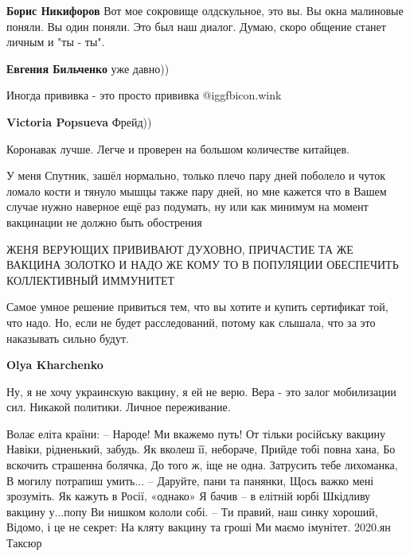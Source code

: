 \begin{itemize}
\begin{itemize} %
\textbf{Борис Никифоров} Вот мое сокровище олдскульное, это вы. Вы окна малиновые поняли. Вы один поняли. Это был наш диалог. Думаю, скоро общение станет личным и "ты - ты".

\textbf{Евгения Бильченко} уже давно))
\end{itemize} %

Иногда прививка - это просто прививка  @igg{fbicon.wink} 

\begin{itemize} %
\textbf{Victoria Popsueva} Фрейд))
\end{itemize} %

Коронавак лучше. Легче и проверен на большом количестве китайцев.


У меня Спутник, зашёл нормально, только плечо пару дней поболело и чуток ломало
кости и тянуло мышцы также пару дней, но мне кажется что в Вашем случае нужно
наверное ещё раз подумать, ну или как минимум на момент вакцинации не должно
быть обострения


ЖЕНЯ ВЕРУЮЩИХ ПРИВИВАЮТ ДУХОВНО, ПРИЧАСТИЕ ТА ЖЕ ВАКЦИНА ЗОЛОТКО И НАДО ЖЕ КОМУ
ТО В ПОПУЛЯЦИИ ОБЕСПЕЧИТЬ КОЛЛЕКТИВНЫЙ ИММУНИТЕТ


Самое умное решение привиться тем, что вы хотите и купить сертификат той, что
надо. Но, если не будет расследований, потому как слышала, что за это
наказывать сильно будут.

\begin{itemize} %
\textbf{Olya Kharchenko} 

Ну, я не хочу украинскую вакцину, я ей не верю. Вера - это
залог мобилизации сил. Никакой политики. Личное переживание.


\obeycr
Волає еліта країни:
– Народе! Ми вкажемо путь!
От тільки російську вакцину
Навіки, рідненький, забудь.
Як вколеш її, небораче,
Прийде тобі повна хана,
Бо вскочить страшенна болячка,
До того ж, іще не одна.
Затрусить тебе лихоманка,
В могилу потрапиш умить...
– Даруйте, пани та панянки,
Щось важко мені зрозуміть.
Як кажуть в Росії, «однако»
Я бачив – в елітній юрбі
Шкідливу вакцину у...попу
Ви нишком кололи собі.
– Ти правий, наш синку хороший,
Відомо, і це не секрет:
На кляту вакцину та гроші
Ми маємо імунітет.
2020.ян Таксюр
\restorecr


\end{itemize}
\end{itemize}
